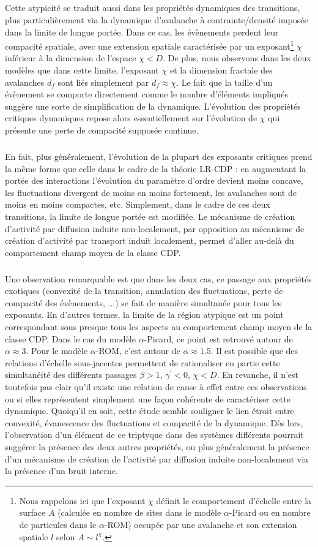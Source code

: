 \subparagraph{}Cette atypicité se traduit aussi dans les propriétés dynamiques des transitions, plus particulièrement via la dynamique d'avalanche à contrainte/densité imposée dans la limite de longue portée. Dans ce cas, les évènements perdent leur compacité spatiale, avec une extension spatiale caractérisée par un exposant\footnote{Nous rappelons ici que l'exposant $\chi$ définit le comportement d'échelle entre la surface $A$ (calculée en nombre de sites dans le modèle $\alpha$-Picard ou en nombre de particules dans le $\alpha$-ROM) occupée par une avalanche et son extension spatiale $l$ selon $A\sim l^\chi$.} $\chi$ inférieur à la dimension de l'espace $\chi < D$. De plus, nous observons dans les deux modèles que dans cette limite, l'exposant $\chi$ et la dimension fractale des avalanches $d_f$ sont liés simplement par $d_f\approx \chi$. Le fait que la taille d'un évènement se comporte directement comme le nombre d'éléments impliqués suggère une sorte de simplification de la dynamique. L'évolution des propriétés critiques dynamiques repose alors essentiellement sur l'évolution de $\chi$ qui présente une perte de compacité supposée continue.

\subparagraph{}En fait, plus généralement, l'évolution de la plupart des exposants critiques prend la même forme que celle dans le cadre de la théorie LR-CDP : en augmentant la portée des interactions l'évolution du paramètre d'ordre devient moins concave, les fluctuations divergent de moins en moins fortement, les avalanches sont de moins en moins compactes, etc. Simplement, dans le cadre de ces deux transitions, la limite de longue portée est modifiée. Le mécanisme de création d'activité par diffusion induite non-localement, par opposition au mécanisme de création d'activité par transport induit localement, permet d'aller au-delà du comportement champ moyen de la classe CDP.

\subparagraph{}Une observation remarquable est que dans les deux cas, ce passage aux propriétés exotiques (convexité de la transition, annulation des fluctuations, perte de compacité des évènements, ...) se fait de manière simultanée pour tous les exposants. En d'autres termes, la limite de la région atypique est un point correspondant sous presque tous les aspects au comportement champ moyen de la classe CDP. Dans le cas du modèle $\alpha$-Picard, ce point est retrouvé autour de $\alpha \approx 3$. Pour le modèle $\alpha$-ROM, c'est autour de $\alpha \approx 1.5$. Il est possible que des relations d'échelle sous-jacentes permettent de rationaliser en partie cette simultanéité des différents passages $\beta > 1$, $\gamma^\prime < 0$, $\chi < D$. En revanche, il n'est toutefois pas clair qu'il existe une relation de cause à effet entre ces observations ou si elles représentent simplement une façon cohérente de caractériser cette dynamique. Quoiqu'il en soit, cette étude semble souligner le lien étroit entre convexité, évanescence des fluctuations et compacité de la dynamique. Dès lors, l'observation d'un élément de ce triptyque dans des systèmes différents pourrait suggérer la présence des deux autres propriétés, ou plus généralement la présence d'un mécanisme de création de l'activité par diffusion induite non-localement via la présence d'un bruit interne.

